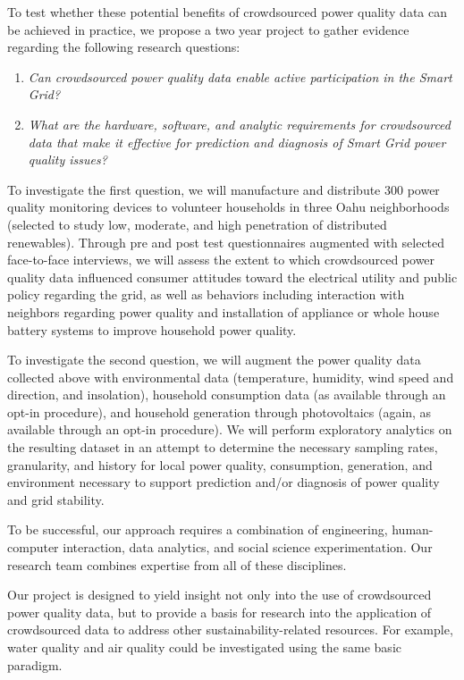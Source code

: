 To test whether these potential benefits of crowdsourced power quality data can be achieved in practice, we propose a two year project to gather evidence regarding the following research questions:

\begin{enumerate}

\item {\em Can crowdsourced power quality data enable active participation in the Smart Grid?}

\item {\em What are the hardware, software, and analytic requirements for crowdsourced data that make it effective for prediction and diagnosis of Smart Grid power quality issues?}

\end{enumerate}

To investigate the first question, we will manufacture and distribute 300 power quality monitoring devices to volunteer households in three Oahu neighborhoods (selected to study low, moderate, and high penetration of distributed renewables). Through pre and post test questionnaires augmented with selected face-to-face interviews, we will assess the extent to which crowdsourced power quality data influenced 
consumer attitudes toward the electrical utility and public policy regarding the grid, as well as behaviors including interaction with neighbors regarding power quality and installation of appliance or whole house battery systems to improve household power quality.

To investigate the second question, we will augment the power quality data collected above with environmental data (temperature, humidity, wind speed and direction, and insolation), household consumption data (as available through an opt-in procedure), and household generation through photovoltaics (again, as available through an opt-in procedure).  We will perform exploratory analytics on the resulting dataset in an attempt to determine the necessary sampling rates, granularity, and history for local power quality, consumption, generation, and environment necessary to support prediction and/or diagnosis of power quality and grid stability. 

To be successful, our approach requires a combination of engineering, human-computer interaction, data analytics, and social science experimentation.  Our research team combines expertise from all of these disciplines.  

Our project is designed to yield insight not only into the use of crowdsourced power quality data, but to provide a basis for research into the application of crowdsourced data to address other sustainability-related resources.  For example, water quality and air quality could be investigated using the same basic paradigm. 

